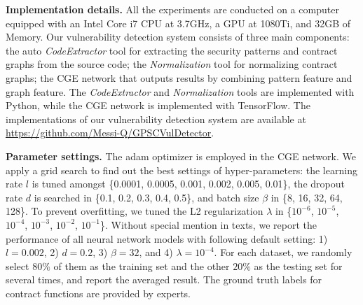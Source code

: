 \textbf{Implementation details.} All the experiments are conducted on a computer equipped with an Intel Core i7 CPU at 3.7GHz, a GPU at 1080Ti, and 32GB of Memory. Our vulnerability detection system consists of three main components: the auto \emph{CodeExtractor} tool for extracting the security patterns and contract graphs from the source code; the \emph{Normalization} tool for normalizing contract graphs; the CGE network that outputs  results by combining pattern feature and graph feature. The \emph{CodeExtractor} and \emph{Normalization} tools are implemented with Python, while the CGE network is implemented with TensorFlow. The implementations of our vulnerability detection system are available at \url{https://github.com/Messi-Q/GPSCVulDetector}. 

\textbf{Parameter settings.} The adam optimizer is employed in the CGE network. We apply a grid search to find out the best settings of hyper-parameters: the learning rate $l$ is tuned amongst \{0.0001, 0.0005, 0.001, 0.002, 0.005, 0.01\}, the dropout rate $d$ is searched in \{0.1, 0.2, 0.3, 0.4, 0.5\}, and batch size $\beta$ in \{8, 16, 32, 64, 128\}. To prevent overfitting, we tuned the L2 regularization $\lambda$ in \{$10^{-6}$, $10^{-5}$, $10^{-4}$, $10^{-3}$, $10^{-2}$, $10^{-1}$\}. Without special mention in texts, we report the performance of all neural network models with following default setting: 1) $l=0.002$, 2) $d=0.2$, 3) $\beta=32$, and 4) $\lambda=10^{-4}$. For each dataset, we randomly select $80\%$ of them as the training set and the other $20\%$ as the testing set for several times, and report the averaged result. The ground truth labels for contract functions are provided by experts.

\vspace{-0.7em}
